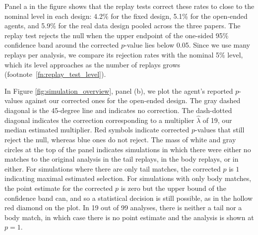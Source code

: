 \documentclass[10pt]{article}
\begin{document}
Panel a in the figure shows that the replay tests correct these rates to close to the nominal level in each design: 4.2\% for the fixed design, 5.1\% for the open-ended agents, and 5.9\% for the real data design pooled across the three papers. The replay test rejects the null when the upper endpoint of the one-sided 95\% confidence band around the corrected $p$-value lies below 0.05. Since we use many replays per analysis, we compare its rejection rates with the nominal 5\% level, which its level approaches as the number of replays grows (footnote~\ref{fn:replay_test_level}).

In Figure \ref{fig:simulation_overview}, panel (b), we plot the agent's reported $p$-values against our corrected ones for the open-ended design. The gray dashed diagonal is the 45-degree line and indicates no correction. The dash-dotted diagonal indicates the correction corresponding to a multiplier $\widehat \lambda$ of 19, our median estimated multiplier. Red symbols indicate corrected $p$-values that still reject the null, whereas blue ones do not reject. The mass of white and gray circles at the top of the panel indicates simulations in which there were either no matches to the original analysis in the tail replays, in the body replays, or in either. For simulations where there are only tail matches, the corrected $p$ is $1$ indicating maximal estimated selection. For simulations with only body matches, the point estimate for the corrected $p$ is zero but the upper bound of the confidence band can, and so a statistical decision is still possible, as in the hollow red diamond on the plot. In 19 out of 99 analyses, there is neither a tail nor a body match, in which case there is no point estimate and the analysis is shown at $p=1$.
\end{document}
